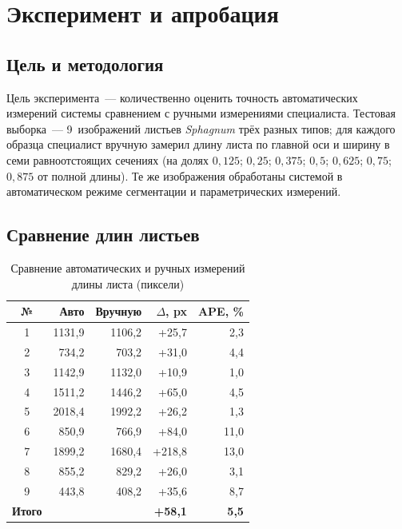 
\section{Эксперимент и апробация}
\label{sec:experiment}

\subsection{Цель и методология}

Цель эксперимента~--- количественно оценить точность автоматических
измерений системы сравнением с ручными измерениями специалиста. Тестовая выборка~--- 9~изображений листьев
\textit{Sphagnum} трёх разных типов; для каждого образца специалист
вручную замерил длину листа по главной оси и ширину в семи равноотстоящих
сечениях (на долях $0{,}125$; $0{,}25$; $0{,}375$; $0{,}5$; $0{,}625$;
$0{,}75$; $0{,}875$ от полной длины). Те же изображения обработаны
системой в автоматическом режиме сегментации и параметрических измерений.

\subsection{Сравнение длин листьев}

\begin{table}[H]
\centering
\caption{Сравнение автоматических и ручных измерений длины листа (пиксели)}
\label{tab:lengths}
\begin{tabular}{crrrr}
\hline
\textbf{№} & \textbf{Авто} & \textbf{Вручную} & $\Delta$, px & APE, \% \\
\hline
1 & 1131{,}9 & 1106{,}2 & +25{,}7  &  2{,}3 \\
2 &  734{,}2 &  703{,}2 & +31{,}0  &  4{,}4 \\
3 & 1142{,}9 & 1132{,}0 & +10{,}9  &  1{,}0 \\
4 & 1511{,}2 & 1446{,}2 & +65{,}0  &  4{,}5 \\
5 & 2018{,}4 & 1992{,}2 & +26{,}2  &  1{,}3 \\
6 &  850{,}9 &  766{,}9 & +84{,}0  & 11{,}0 \\
7 & 1899{,}2 & 1680{,}4 & +218{,}8 & 13{,}0 \\
8 &  855{,}2 &  829{,}2 & +26{,}0  &  3{,}1 \\
9 &  443{,}8 &  408{,}2 & +35{,}6  &  8{,}7 \\
\hline
\textbf{Итого} & & & \textbf{+58{,}1} & \textbf{5{,}5} \\
\hline
\end{tabular}
\end{table}

